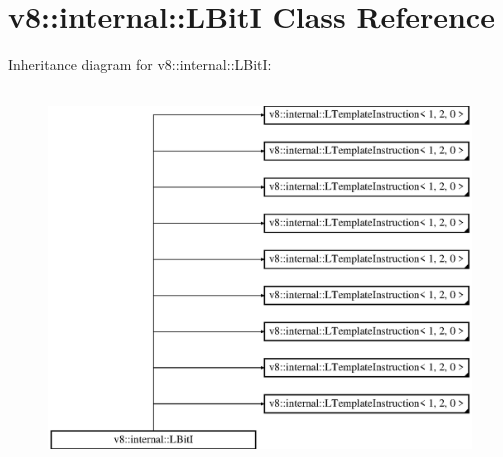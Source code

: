 \hypertarget{classv8_1_1internal_1_1_l_bit_i}{}\section{v8\+:\+:internal\+:\+:L\+BitI Class Reference}
\label{classv8_1_1internal_1_1_l_bit_i}
Inheritance diagram for v8\+:\+:internal\+:\+:L\+BitI\+:\begin{figure}[H]
\begin{center}
\leavevmode
\includegraphics[height=10.000000cm]{classv8_1_1internal_1_1_l_bit_i}
\end{center}
\end{figure}
